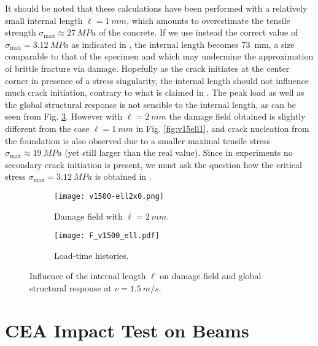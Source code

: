 It should be noted that these calculations have been performed with a relatively small internal length $\ell=\SI{1}{mm}$, which amounts to overestimate the tensile strength $\sigma_\mathrm{max}\approx \SI{27}{MPa}$ of the concrete. If we use instead the correct value of $\sigma_\mathrm{max}=\SI{3.12}{MPa}$ as indicated in \cite{OzboltBedeSharmaMayer:2015}, the internal length becomes \SI{73}{mm}, a size comparable to that of the specimen and which may undermine the approximation of brittle fracture via damage. Hopefully as the crack initiates at the center corner in presence of a stress singularity, the internal length should not influence much crack initiation, contrary to what is claimed in \cite{MesgarnejadBourdinKhonsari:2014}. The peak load as well as the global structural response is not sensible to the internal length, as can be seen from Fig. \ref{fig:alphav1500ell2x0F}. However with $\ell=\SI{2}{mm}$ the damage field obtained is slightly different from the case $\ell=\SI{1}{mm}$ in Fig. \ref{fig:v15ell1}, and crack nucleation from the foundation is also observed due to a smaller maximal tensile stress $\sigma_\mathrm{max}\approx \SI{19}{MPa}$ (yet still larger than the real value). Since in experiments no secondary crack initiation is present, we must ask the question how the critical stress $\sigma_\mathrm{max}=\SI{3.12}{MPa}$ is obtained in \cite{OzboltBedeSharmaMayer:2015}.
\begin{figure}[htbp]
\centering
\begin{subfigure}[b]{0.48\textwidth}
\centering
\texttt{[image: v1500-ell2x0.png]}
\caption{Damage field with $\ell=\SI{2}{mm}$.} \label{fig:alphav1500ell2x0}
\end{subfigure}
\begin{subfigure}[b]{0.48\textwidth}
\centering
\texttt{[image: F\_v1500\_ell.pdf]}
\caption{Load-time histories.} \label{fig:alphav1500ell2x0F}
\end{subfigure}
\caption{Influence of the internal length $\ell$ on damage field and global structural response at $v=\SI{1.5}{m/s}$.}
\end{figure}

\section{CEA Impact Test on Beams} \label{sec:beam}